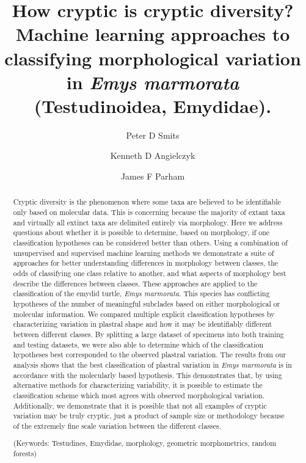 \documentclass[12pt,letterpaper]{article}\usepackage{graphicx, color}
\title{How cryptic is cryptic diversity? Machine learning approaches to classifying morphological variation in \textit{Emys marmorata} (Testudinoidea, Emydidae).}
\author[1]{Peter D Smits}%
\author[1,2]{Kenneth D Angielczyk}%
\author[3]{James F Parham}%
\affil[1]{Committee on Evolutionary Biology, University of Chicago}
\affil[2]{Integrative Research Center, Field Museum of Natural History}
\affil[3]{Department of Geological Sciences, California State University -- Fullerton}
\begin{document}
\maketitle
{}

\linenumbers
\modulolinenumbers[2]

\begin{abstract}
  Cryptic diversity is the phenomenon where some taxa are believed to be identifiable only based on molecular data. This is concerning because the majority of extant taxa and virtually all extinct taxa are delimited entirely via morphology. Here we address questions about whether it is possible to determine, based on morphology, if one classification hypotheses can be considered better than others. %
  Using a combination of unsupervised and supervised machine learning methods we demonstrate a suite of approaches for better understanding differences in morphology between classes, the odds of classifying one class relative to another, and what aspects of morphology best describe the differences between classes.
  These approaches are applied to the classification of the emydid turtle, \textit{Emys marmorata}. This species has conflicting hypotheses of the number of meaningful subclades based on either morphological or molecular information. We compared multiple explicit classification hypotheses by characterizing variation in plastral shape and how it may be identifiably different between different classes. By splitting a large dataset of specimens into both training and testing datasets, we were also able to determine which of the classification hypotheses best corresponded to the observed plastral variation.
  The results from our analysis shows that the best classification of plastral variation in \textit{Emys marmorata} is in accordance with the molecularly based hypothesis. This demonstrates that, by using alternative methods for characterizing variability, it is possible to estimate the classification scheme which most agrees with observed morphological variation. Additionally, we demonstrate that it is possible that not all examples of cryptic variation may be truly cryptic, just a product of sample size or methodology because of the extremely fine scale variation between the different classes.
 
\noindent (Keywords: Testudines, Emydidae, morphology, geometric morphometrics, random forests)
\end{abstract}
\end{document}
